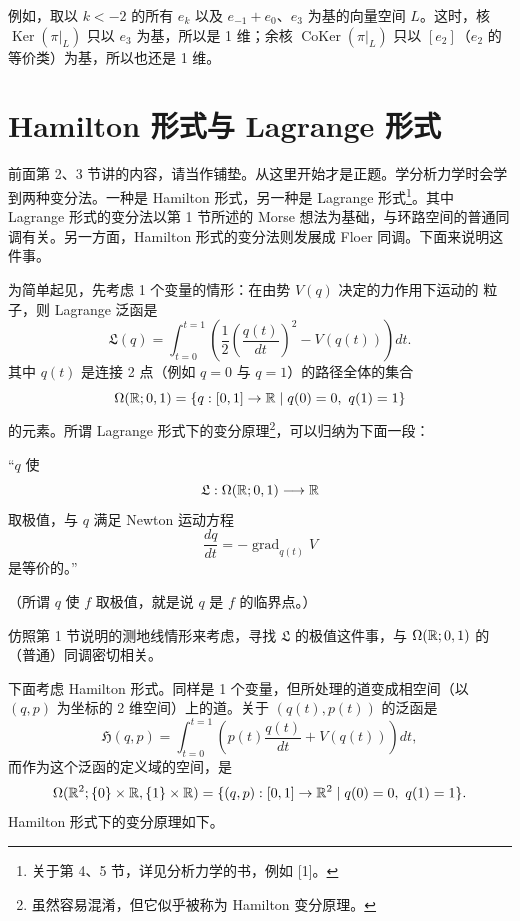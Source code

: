 例如，取以 $k<-2$ 的所有 $e_k$ 以及 $e_{-1}+e_0$、$e_3$ 为基的向量空间 $L$。这时，核 $\operatorname{Ker}(\pi|_L)$ 只以 $e_3$ 为基，所以是 1 维；余核 $\operatorname{CoKer}(\pi|_L)$ 只以 $[e_2]$（$e_2$ 的等价类）为基，所以也还是 1 维。

\section{Hamilton 形式与 Lagrange 形式}

前面第 2、3 节讲的内容，请当作铺垫。从这里开始才是正题。学分析力学时会学到两种变分法。一种是 Hamilton 形式，另一种是 Lagrange 形式\footnote{关于第 4、5 节，详见分析力学的书，例如 [1]。}。其中 Lagrange 形式的变分法以第 1 节所述的 Morse 想法为基础，与环路空间的普通同调有关。另一方面，Hamilton 形式的变分法则发展成 Floer 同调。下面来说明这件事。

为简单起见，先考虑 1 个变量的情形：在由势 $V(q)$ 决定的力作用下运动的
粒子，则 Lagrange 泛函是
\[ \mathfrak{L}(q)=\int_{t=0}^{t=1}\left(\frac{1}{2}\left(\frac{q(t)}{dt}\right)^{2}-V(q(t))\right)dt. \]
其中 $q(t)$ 是连接 2 点（例如 $q=0$ 与 $q=1$）的路径全体的集合
\[ \Omega(\R;0,1)=\{q:[0,1]\to\R\mid q(0)=0,\ q(1)=1\} \]
的元素。所谓 Lagrange 形式下的变分原理\footnote{虽然容易混淆，但它似乎被称为 Hamilton 变分原理。}，可以归纳为下面一段：

“$q$ 使
\[ \mathfrak{L}:\Omega(\mathbb{R};0,1)\longrightarrow\mathbb{R} \]
取极值，与 $q$ 满足 Newton 运动方程
\[ \frac{dq}{dt}=-\operatorname{grad}_{q(t)}V \tag{1} \]
是等价的。”

（所谓 $q$ 使 $f$ 取极值，就是说 $q$ 是 $f$ 的临界点。）

仿照第 1 节说明的测地线情形来考虑，寻找 $\mathfrak{L}$ 的极值这件事，与 $\Omega(\mathbb{R};0,1)$ 的（普通）同调密切相关。

下面考虑 Hamilton 形式。同样是 1 个变量，但所处理的道变成相空间（以 $(q,p)$ 为坐标的 2 维空间）上的道。关于 $(q(t),p(t))$ 的泛函是
\[ \mathfrak{H}(q,p)=\int_{t=0}^{t=1}\left(p(t)\frac{q(t)}{dt}+V(q(t))\right)dt, \]
而作为这个泛函的定义域的空间，是
\[ \Omega(\mathbb{R}^{2};\{0\}\times\mathbb{R},\{1\}\times\mathbb{R})=\{(q,p):[0,1]\to\mathbb{R}^{2}\mid q(0)=0,\ q(1)=1\}. \]
Hamilton 形式下的变分原理如下。

